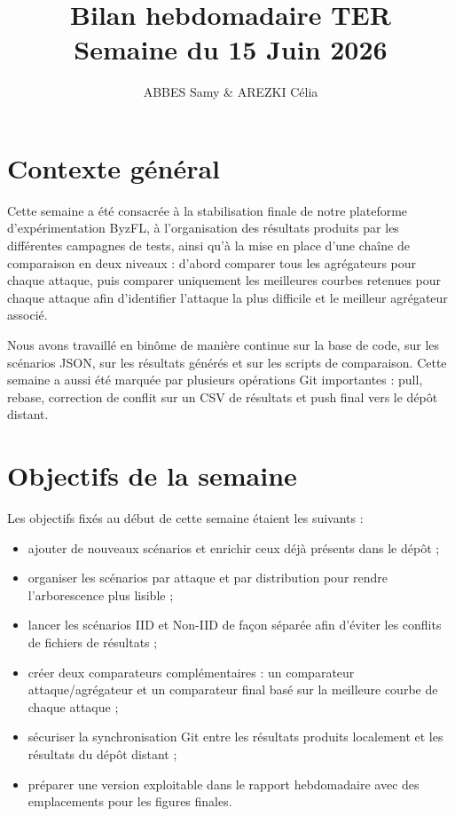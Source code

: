 \documentclass[11pt, a4paper]{article}
\title{\textbf{Bilan hebdomadaire TER} \\ \large Semaine du 15 Juin 2026}
\author{ABBES Samy \& AREZKI Célia}
\date{}
\begin{document}
\maketitle

\section{Contexte général}
Cette semaine a été consacrée à la stabilisation finale de notre plateforme d'expérimentation ByzFL, à l'organisation des résultats produits par les différentes campagnes de tests, ainsi qu'à la mise en place d'une chaîne de comparaison en deux niveaux : d'abord comparer tous les agrégateurs pour chaque attaque, puis comparer uniquement les meilleures courbes retenues pour chaque attaque afin d'identifier l'attaque la plus difficile et le meilleur agrégateur associé.

Nous avons travaillé en binôme de manière continue sur la base de code, sur les scénarios JSON, sur les résultats générés et sur les scripts de comparaison. Cette semaine a aussi été marquée par plusieurs opérations Git importantes : pull, rebase, correction de conflit sur un CSV de résultats et push final vers le dépôt distant.

\section{Objectifs de la semaine}
Les objectifs fixés au début de cette semaine étaient les suivants :
\begin{itemize}
    \item ajouter de nouveaux scénarios et enrichir ceux déjà présents dans le dépôt ;
    \item organiser les scénarios par attaque et par distribution pour rendre l'arborescence plus lisible ;
    \item lancer les scénarios IID et Non-IID de façon séparée afin d'éviter les conflits de fichiers de résultats ;
    \item créer deux comparateurs complémentaires : un comparateur attaque/agrégateur et un comparateur final basé sur la meilleure courbe de chaque attaque ;
    \item sécuriser la synchronisation Git entre les résultats produits localement et les résultats du dépôt distant ;
    \item préparer une version exploitable dans le rapport hebdomadaire avec des emplacements pour les figures finales.
\end{itemize}
\end{document}
